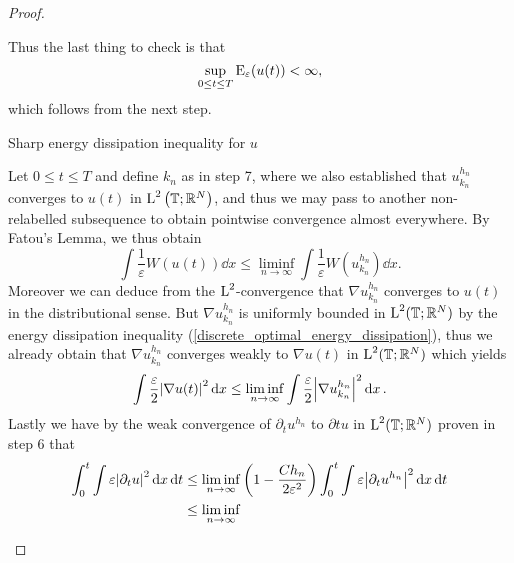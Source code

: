 \begin{proof}
\begin{description}[wide=0pt]
		Thus the last thing to check is that
		\begin{equation*}
			\sup_{ 0 \leq t \leq T }
			\operatorname{E}_{ \varepsilon } ( u( t ) )
			<
			\infty,
		\end{equation*}
		which follows from the next step.
		
		\item[Step 8:] Sharp energy dissipation inequality for $ u $
		
		Let $ 0 \leq t \leq T $ and define $ k_{ n } $ as in step 7, where we also established that $ u_{ k_{ n } }^{ h_{ n } } $ converges to $ u ( t ) $ in $ \operatorname{L}^{ 2 } \left( \operatorname{\mathbb{T}} ; \mathbb{ R }^{ N } \right) $, and thus we may pass to another non-relabelled subsequence to obtain pointwise convergence almost everywhere. By Fatou's Lemma, we thus obtain
		\begin{equation*}
			\int
			\frac{ 1 }{ \varepsilon }
			W ( u ( t ) ) 
			\dd{ x }
			\leq
			\liminf_{ n \to \infty }
			\int
			\frac{ 1 }{ \varepsilon }
			W ( u_{ k_{ n } }^{ h_{ n } } )
			\dd{ x }.
		\end{equation*}
		Moreover we can deduce from the $ \operatorname{L}^{ 2 } $-convergence that $ \nabla u_{ k_{ n } }^{ h_{ n } } $ converges to $ u( t ) $ in the distributional sense. But $ \nabla u_{ k_{ n } }^{ h_{ n } } $ is uniformly bounded in $ \operatorname{L}^{ 2 } ( \operatorname{\mathbb{T}} ; \mathbb{ R }^{ N } ) $ by the energy dissipation inequality (\ref{discrete_optimal_energy_dissipation}), thus we already obtain that $ \nabla u_{ k_{ n } }^{ h_{ n } } $ converges weakly to $ \nabla u ( t ) $ in $ \operatorname{L}^{ 2 } ( \operatorname{\mathbb{T}}; \mathbb{ R }^{ N } ) $ which yields
		\begin{equation*}
			\int 
			\frac{ \varepsilon }{ 2 }
			\abs{ \nabla u ( t ) }^{ 2 }
			\dd{ x }
			\leq
			\liminf_{ n \to \infty }
			\int
			\frac{ \varepsilon }{ 2 }
			\abs{ \nabla u_{ k_{ n } }^{ h_{ n } } }^{ 2 }
			\dd{ x }.
		\end{equation*}
		Lastly we have by the weak convergence of $ \partial_{ t } u^{ h_{n } } $ to $ \partial{ t} u $ in $\operatorname{L}^{ 2 } ( \operatorname{\mathbb{T}} ; \mathbb{ R }^{ N } ) $ proven in step 6 that
		\begin{align*}
			\int_{ 0 }^{ t }
			\int
			\varepsilon
			\abs{ \partial_{ t } u }^{ 2 }
			\dd{ x }
			\dd{ t }
			& \leq
			\liminf_{ n \to \infty }
			\left( 1 - \frac{ C h_{ n } }{ 2 \varepsilon^{ 2 } } \right)
			\int_{ 0 }^{ t }
			\int
			\varepsilon
			\abs{ \partial_{ t } u^{ h_{ n } } }^{ 2 }
			\dd{ x }
			\dd{ t }
			\\
			& \leq
			\liminf_{ n \to \infty }

\end{align*}
\end{description}
\end{proof}
